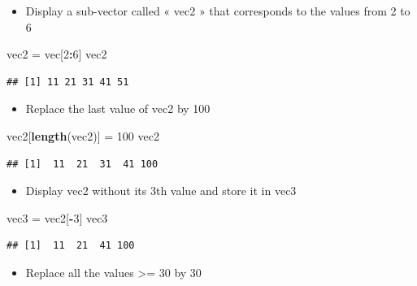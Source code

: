 \documentclass[]{article}
\newenvironment{Shaded}{\begin{snugshade}}{\end{snugshade}}
\newcommand{\KeywordTok}[1]{\textcolor[rgb]{0.13,0.29,0.53}{\textbf{#1}}}
\newcommand{\DecValTok}[1]{\textcolor[rgb]{0.00,0.00,0.81}{#1}}
\newcommand{\StringTok}[1]{\textcolor[rgb]{0.31,0.60,0.02}{#1}}
\newcommand{\OperatorTok}[1]{\textcolor[rgb]{0.81,0.36,0.00}{\textbf{#1}}}
\newcommand{\NormalTok}[1]{#1}
\providecommand{\tightlist}{%
  \setlength{\itemsep}{0pt}\setlength{\parskip}{0pt}}
\begin{document}
\begin{enumerate}
  \begin{itemize}
  \tightlist
  \item
    Display a sub-vector called « vec2 » that corresponds to the values
    from 2 to 6
  \end{itemize}

\begin{Shaded}
\begin{Highlighting}[]
\NormalTok{vec2 =}\StringTok{ }\NormalTok{vec[}\DecValTok{2}\OperatorTok{:}\DecValTok{6}\NormalTok{]}
\NormalTok{vec2}
\end{Highlighting}
\end{Shaded}

\begin{verbatim}
## [1] 11 21 31 41 51
\end{verbatim}

  \begin{itemize}
  \tightlist
  \item
    Replace the last value of vec2 by 100
  \end{itemize}

\begin{Shaded}
\begin{Highlighting}[]
\NormalTok{vec2[}\KeywordTok{length}\NormalTok{(vec2)] =}\StringTok{ }\DecValTok{100}
\NormalTok{vec2}
\end{Highlighting}
\end{Shaded}

\begin{verbatim}
## [1]  11  21  31  41 100
\end{verbatim}

  \begin{itemize}
  \tightlist
  \item
    Display vec2 without its 3th value and store it in vec3
  \end{itemize}

\begin{Shaded}
\begin{Highlighting}[]
\NormalTok{vec3 =}\StringTok{ }\NormalTok{vec2[}\OperatorTok{-}\DecValTok{3}\NormalTok{]}
\NormalTok{vec3}
\end{Highlighting}
\end{Shaded}

\begin{verbatim}
## [1]  11  21  41 100
\end{verbatim}

  \begin{itemize}
  \tightlist
  \item
    Replace all the values \textgreater{}= 30 by 30
  \end{itemize}


\end{enumerate}
\end{document}
